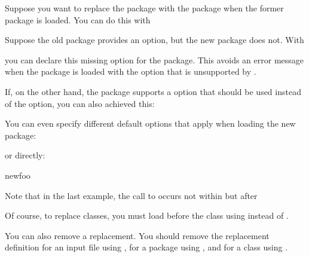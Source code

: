 \begin{Example}
  Suppose you want to replace the  package with the
   package when the former package is loaded. You can do this with
\begin{lstcode}
\end{lstcode}
  Suppose the old package provides an  option, but the new
  package does not. With
\begin{lstcode}
\end{lstcode}
  you can declare this missing option for the  package. This
  avoids an error message when the  package is loaded with the
  option that is unsupported by .

  If, on the other hand, the  package supports a
   option that should be used instead of the 
  option, you can also achieved this:
\begin{lstcode}
\end{lstcode}
  You can even specify different default options that apply when loading the
  new package:
\begin{lstcode}
\end{lstcode}
  or directly:
\begin{lstcode}
                       {newfoo}%
\end{lstcode}
  Note that in the last example, the call to 
  occurs not within but after 
\end{Example}

Of course, to replace classes, you must load  before the
class using  instead of .
%
\EndIndexGroup


\begin{Declaration}
\end{Declaration}
You can also remove a replacement. You
should remove the replacement definition for an input file using
, for a package using , and for
a class using .%
\EndIndexGroup


